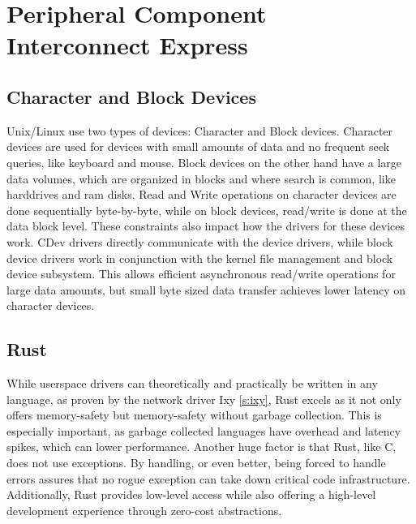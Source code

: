 \section{Peripheral Component Interconnect Express}



\subsection{Character and Block Devices}
Unix/Linux use two types of devices: Character and Block devices. Character devices are used for devices with small amounts of data and no frequent seek queries, like keyboard and mouse. Block devices on the other hand have a large data volumes, which are organized in blocks and where search is common, like harddrives and ram disks.
Read and Write operations on character devices are done sequentially byte-by-byte, while on block devices, read/write is done at the data block level.
These constraints also impact how the drivers for these devices work. CDev drivers directly communicate with the device drivers, while block device drivers work in conjunction with the kernel file management and block device subsystem. This allows efficient asynchronous read/write operations for large data amounts, but small byte sized data transfer achieves lower latency on character devices.

\subsection{Rust}
While userspace drivers can theoretically and practically be written in any language, as proven by the network driver Ixy \autoref{s:ixy}, Rust excels as it not only offers memory-safety but memory-safety without garbage collection. This is especially important, as garbage collected languages have overhead and latency spikes, which can lower performance. Another huge factor is that Rust, like C, does not use exceptions. By handling, or even better, being forced to handle errors assures that no rogue exception can take down critical code infrastructure.
Additionally, Rust provides low-level access while also offering a high-level development experience through zero-cost abstractions.